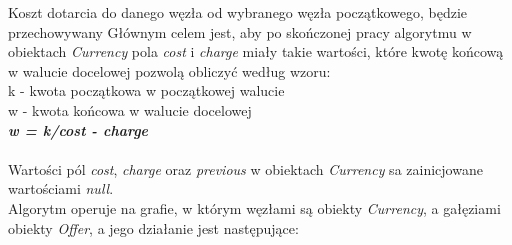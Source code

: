 \documentclass[a4paper,11pt]{article}
\begin{document}
Koszt dotarcia do danego węzła od wybranego węzła początkowego, będzie przechowywany
Głównym celem jest, aby po skończonej pracy algorytmu w obiektach \textit{Currency} pola \textit{cost} i \textit{charge} miały takie wartości, które kwotę końcową w walucie docelowej pozwolą obliczyć według wzoru:
\\k - kwota początkowa w początkowej walucie
\\w - kwota końcowa w walucie docelowej
\\
\textbf{\emph{w = k/cost - charge}}
\\
\\Wartości pól \textit{cost}, \textit{charge} oraz \textit{previous} w obiektach \textit{Currency} sa zainicjowane wartościami \textit{null}.
\\


Algorytm operuje na grafie, w którym węzłami są obiekty \textit{Currency}, a gałęziami obiekty \textit{Offer}, a jego działanie jest następujące:
\end{document}
